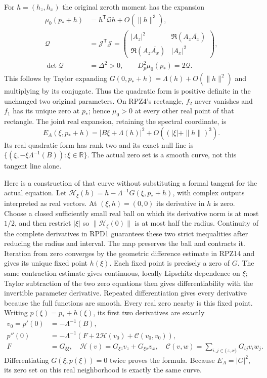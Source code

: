 For $h=(h_z,h_x)$ the original zeroth moment has the expansion
\[
 \begin{aligned}
 \mu_0(p_*+h)&=h^{\mathsf T}\mathcal Qh+O(\|h\|^3),\\
 \mathcal Q&=\mathcal J^{\mathsf T}\mathcal J
 =\begin{pmatrix}|A_z|^2&\Re(A_z\overline{A_x})\\
                 \Re(A_z\overline{A_x})&|A_x|^2\end{pmatrix},\\
 \det\mathcal Q&=\Delta^2>0,
 \qquad D_p^2\mu_0(p_*)=2\mathcal Q.
 \end{aligned}\tag{RPD5}
\]
This follows by Taylor expanding $G(0,p_*+h)=\Lambda(h)+O(\|h\|^2)$
and multiplying by its conjugate.  Thus the quadratic form is positive
definite in the unchanged two original parameters.  On RPZ4's
rectangle, $f_2$ never vanishes and $f_1$ has its unique zero at $p_*$;
hence $\mu_0>0$ at every other real point of that rectangle.
The joint real expansion, retaining the spectral coordinate, is
\[
 E_A(\xi,p_*+h)=|B\xi+\Lambda(h)|^2
                 +O((|\xi|+\|h\|)^3).\tag{RPD6}
\]
Its real quadratic form has rank two and its exact null line is
$\{(\xi,-\xi\Lambda^{-1}(B)):\xi\in\mathbb R\}$.
The actual zero set is a smooth curve, not this tangent line alone.

Here is a construction of that curve without substituting a formal
tangent for the actual equation.  Let
$\mathcal H_\xi(h)=h-\Lambda^{-1}G(\xi,p_*+h)$, with complex outputs
interpreted as real vectors.  At $(\xi,h)=(0,0)$ its derivative in
$h$ is zero.  Choose a closed sufficiently small real ball on which
its derivative norm is at most $1/2$, and then restrict $|\xi|$ so
$\|\mathcal H_\xi(0)\|$ is at most half the radius.  Continuity of
the complete derivatives in RPD1 guarantees these two strict
inequalities after reducing the radius and interval.  The map
preserves the ball and contracts it.  Iteration from zero converges
by the geometric difference estimate in RPZ14 and gives its unique
fixed point $h(\xi)$.  Each fixed point is precisely a zero of $G$.
The same contraction estimate gives continuous, locally Lipschitz
dependence on $\xi$; Taylor subtraction of the two zero equations
then gives differentiability with the invertible parameter derivative.
Repeated differentiation gives every derivative because the full
functions are smooth.  Every real zero nearby is this fixed point.
Writing $p(\xi)=p_*+h(\xi)$, its first two derivatives are exactly
\[
 \begin{aligned}
 v_0=p'(0)&=-\Lambda^{-1}(B),\\
 p''(0)&=-\Lambda^{-1}\left(F+2\mathcal H(v_0)+\mathcal C(v_0,v_0)\right),\\
 F&=G_{\xi\xi},\quad
 \mathcal H(v)=G_{\xi z}v_z+G_{\xi x}v_x,\quad
 \mathcal C(v,w)=\sum_{i,j\in\{z,x\}}G_{ij}v_iw_j.
 \end{aligned}\tag{RPD7}
\]
Differentiating $G(\xi,p(\xi))=0$ twice proves the formula.  Because
$E_A=|G|^2$, its zero set on this real neighborhood is exactly the
same curve.

